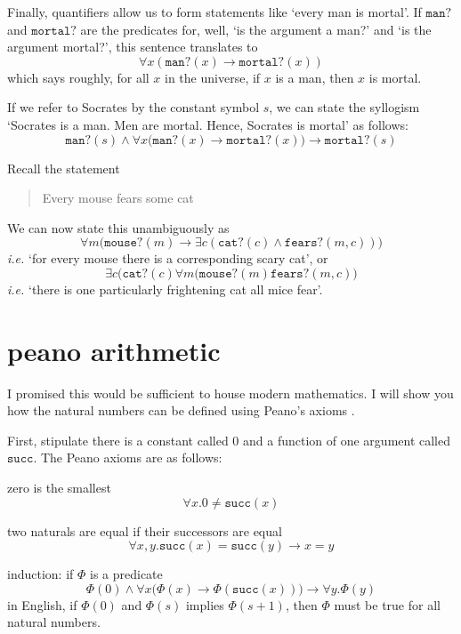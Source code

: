 \documentclass{scrbook}
\renewcommand{\implies}{\to}
\begin{document}
Finally, quantifiers allow us to form statements like `every man is mortal'. If $\texttt{man?}$ and $\texttt{mortal?}$ are the predicates for, well, `is the argument a man?' and `is the argument mortal?', this sentence translates to
\[
\forall x ( \texttt{man?}(x) \implies \texttt{mortal?}(x) )
\]
which says roughly, for all $x$ in the universe, if $x$ is a man, then $x$ is mortal. 

If we refer to Socrates by the constant symbol $s$, we can state the syllogism `Socrates is a man. Men are mortal. Hence, Socrates is mortal' as follows:
\[
\texttt{man?}(s) \wedge \forall x \bigl(\texttt{man?}(x)\implies\texttt{mortal?}(x)\bigr) \implies \texttt{mortal?}(s)
\]

Recall the statement
\begin{quote}
  Every mouse fears some cat
\end{quote}
We can now state this unambiguously as 
\[
\forall m \bigr(\texttt{mouse?}(m) \implies \exists c (\texttt{cat?}(c)\wedge \texttt{fears?}(m,c)) \bigl)
\]
\emph{i.e.} `for every mouse there is a corresponding scary cat', or 
\[
\exists c \bigl(\texttt{cat?}(c) \forall m (\texttt{mouse?}(m) \texttt{fears?}(m,c)\bigr)
\]
\emph{i.e.} `there is one particularly frightening cat all mice fear'.

\section[Peano Arithmetic]{peano arithmetic}
I promised this would be sufficient to house modern mathematics. I will show you how the natural numbers can be defined using Peano's axioms \cite{wiki:peano}. 

\renewcommand{\succ}{\texttt{succ}}
First, stipulate there is a constant called $0$ and a function of one argument called $\succ$. 
The Peano axioms are as follows: 
\begin{trivlist}
\item zero is the smallest
  \[
  \forall x. 0 \neq \succ(x)
  \]
\item two naturals are equal if their successors are equal
  \[
  \forall x,y. \succ (x) = \succ(y) \implies x=y
  \]
\item induction: if $\Phi$ is a predicate 
  \[
  \Phi(0) \wedge \forall x \bigl(\Phi(x)\implies \Phi(\succ(x))\bigr) \implies \forall y.\Phi(y)
  \]
  in English, if $\Phi(0)$ and $\Phi(s)$ implies $\Phi(s+1)$, then $\Phi$ must be true for all natural numbers. 
\end{trivlist}
\printbibliography
\end{document}
